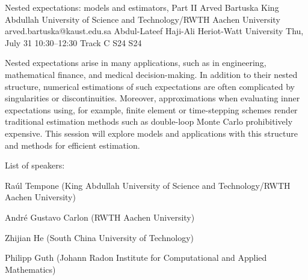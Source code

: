 \begin{talk}
  {Nested expectations: models and estimators, Part II}%
  {Arved Bartuska}%
  {King Abdullah University of Science and Technology/RWTH Aachen University}%
  {arved.bartuska@kaust.edu.sa}%
  {Abdul-Lateef Haji-Ali}%
  {Heriot-Watt University}%
  {Thu, July 31 10:30–12:30 Track C}%
  {S24}%
  {S24}%

Nested expectations arise in many applications, such as in engineering, mathematical finance, and medical decision-making. In addition to their nested structure, numerical estimations of such expectations are often complicated by singularities or discontinuities. Moreover, approximations when evaluating inner expectations using, for example, finite element or time-stepping schemes render traditional estimation methods such as double-loop Monte Carlo prohibitively expensive. This session will explore models and applications with this structure and methods for efficient estimation.

List of speakers:

Ra\'{u}l Tempone (King Abdullah University of Science and Technology/RWTH Aachen University)

Andr\'{e} Gustavo Carlon (RWTH Aachen University)

Zhijian He (South China University of Technology)

Philipp Guth (Johann Radon Institute for Computational and Applied Mathematics)

\end{talk}

